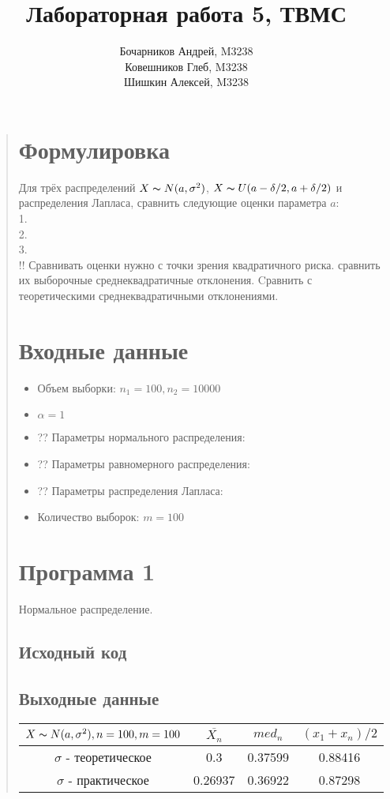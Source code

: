 \documentclass{article}
\begin{document}
\title{Лабораторная работа 5, ТВМС}
\author{
	Бочарников Андрей, M3238\\
	Ковешников Глеб, M3238\\
	Шишкин Алексей, M3238
}
\maketitle

\begin{quote}
\section{Формулировка}
	Для трёх распределений $X \thicksim N(a, \sigma^2)$, $X \thicksim U(a - \delta / 2, a + \delta / 2)$ и распределения Лапласа, сравнить следующие оценки параметра $a$:\\
	1. \\
	2. \\
	3. \\
	!! Сравнивать оценки нужно с точки зрения квадратичного риска. сравнить их выборочные среднеквадратичные отклонения. Cравнить с теоретическими среднеквадратичными отклонениями.
\section{Входные данные}
        \begin{itemize}
            \item Объем выборки: $n_1 = 100, n_2 = 10000$
            \item $\alpha = 1$
	    \item ?? Параметры нормального распределения:
	    \item ?? Параметры равномерного распределения:
	    \item ?? Параметры распределения Лапласа: 
	    \item Количество выборок: $m = 100$
        \end{itemize}
\section{Программа 1}	
        Нормальное распределение. \\
\subsection{Исходный код}
	
\subsection{Выходные данные}
\begin{tabular}{ | c | c | c | c | }
\hline
$X \thicksim N(a, \sigma^2), n = 100, m = 100$ & $\overline{X_n}$ & $med_n$ & $(x_1 + x_n) / 2$ \\ \hline
$\sigma$ - теоретическое &  0.3 & 0.37599 & 0.88416 \\ \hline
$\sigma$ - практическое & 0.26937 & 0.36922 & 0.87298 \\
\hline
\end{tabular}


\end{quote}
\end{document}
